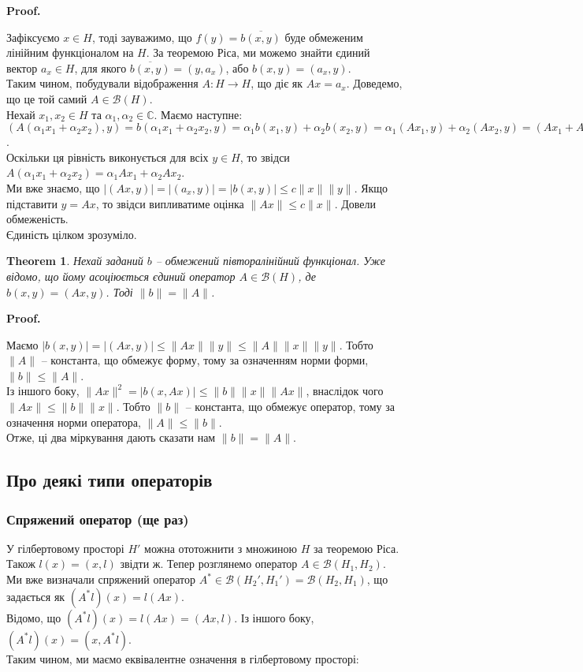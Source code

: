 \documentclass[a4paper, 10pt]{article}
\makeatletter
\theoremstyle{theoremdd}
\newtheorem{theorem}{Theorem}[subsection]
\theoremstyle{theoremdd}
\theoremstyle{theoremdd}
\theoremstyle{theoremdd}
\theoremstyle{theoremdd}
\theoremstyle{theoremdd}
\theoremstyle{theoremdd}
\theoremstyle{theoremdd}
\renewenvironment{proof}[1][Proof.\\]{\par
\pushQED{\hfill \qed}%
\normalfont \topsep6\p@\@plus6\p@\relax
\trivlist
\item\relax
{\bfseries
#1\@addpunct{.}}\hspace\labelsep\ignorespaces
}{%
\popQED\endtrivlist\@endpefalse
}
\makeatother
\begin{document}
\begin{proof}
Зафіксуємо $x \in H$, тоді зауважимо, що $f(y) = \overline{b(x,y)}$ буде обмеженим лінійним функціоналом на $H$. За теоремою Ріса, ми можемо знайти єдиний вектор $a_x \in H$, для якого $\overline{b(x,y)} = (y,a_x)$, або $b(x,y) = (a_x,y)$.\\
Таким чином, побудували відображення $A \colon H \to H$, що діє як $Ax = a_x$. Доведемо, що це той самий $A \in \mathcal{B}(H)$.\\
Нехай $x_1,x_2 \in H$ та $\alpha_1,\alpha_2 \in \mathbb{C}$. Маємо наступне:\\
$(A(\alpha_1 x_1 + \alpha_2 x_2), y) = b(\alpha_1 x_1 + \alpha_2 x_2,y) = \alpha_1 b(x_1,y) + \alpha_2 b(x_2,y) = \alpha_1 (Ax_1,y) + \alpha_2 (Ax_2,y) = (Ax_1 + Ax_2, y)$.\\
Оскільки ця рівність виконується для всіх $y \in H$, то звідси $A(\alpha_1 x_1 + \alpha_2 x_2) = \alpha_1 Ax_1 + \alpha_2 Ax_2$.\\
Ми вже знаємо, що $|(Ax,y)| = |(a_x,y)| = |b(x,y)| \leq c \|x\| \|y\|$. Якщо підставити $y = Ax$, то звідси випливатиме оцінка $\|Ax\| \leq c \|x\|$. Довели обмеженість.\\
Єдиність цілком зрозуміло.
\end{proof}

\begin{theorem}
Нехай заданий $b$ -- обмежений півторалінійний функціонал. Уже відомо, що йому асоціюється єдиний оператор $A \in \mathcal{B}(H)$, де $b(x,y) = (Ax,y)$. Тоді $\|b\| = \|A\|$.
\end{theorem}

\begin{proof}
Маємо $|b(x,y)| = |(Ax,y)| \leq \|Ax\| \|y\| \leq \|A\| \|x\| \|y\|$. Тобто $\|A\|$ -- константа, що обмежує форму, тому за означенням норми форми, $\|b\| \leq \|A\|$.\\
Із іншого боку, $\|Ax\|^2 = |b(x,Ax)| \leq \|b\| \|x\| \|Ax\|$, внаслідок чого $\|Ax\| \leq \|b\| \|x\|$. Тобто  $\|b\|$ -- константа, що обмежує оператор, тому за означення норми оператора, $\|A\| \leq \|b\|$.\\
Отже, ці два міркування дають сказати нам $\|b\| = \|A\|$.
\end{proof}

\subsection{Про деякі типи операторів}
\subsubsection{Спряжений оператор (ще раз)}
У гілбертовому просторі $H'$ можна ототожнити з множиною $H$ за теоремою Ріса. Також $l(x) = (x,l)$ звідти ж. Тепер розглянемо оператор $A \in \mathcal{B}(H_1,H_2)$. Ми вже визначали спряжений оператор $A^* \in \mathcal{B}(H_2',H_1') = \mathcal{B}(H_2,H_1)$, що задається як $(A^*l)(x) = l(Ax)$.\\
Відомо, що $(A^*l)(x) = l(Ax) = (Ax,l)$. Із іншого боку, $(A^*l)(x) = (x,A^*l)$.\\
Таким чином, ми маємо еквівалентне означення в гілбертовому просторі:
\end{document}
